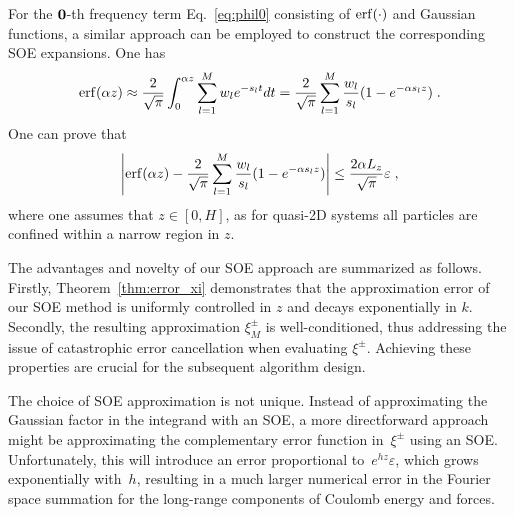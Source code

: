 For the $\boldsymbol{0}$-th frequency term Eq.~\eqref{eq:phil0} consisting of $\operatorname{erf}(\cdot)$ and Gaussian functions, a similar approach can be employed to construct the corresponding SOE expansions. One has
\begin{equation}\label{eq:SOErf}
	\begin{split}
		\operatorname{erf}(\alpha z)\approx \frac{2}{\sqrt{\pi}} \int_0^{\alpha z} \sum_{l = 1}^M w_l e^{-s_l t} dt= \frac{2}{\sqrt{\pi}} \sum_{l = 1}^M \frac{w_l}{s_l} (1 - e^{- \alpha s_l z})\;.
	\end{split}
\end{equation}
One can prove that
\begin{equation}\label{eq::erfSOE}
	\left|\operatorname{erf}(\alpha z)-\frac{2}{\sqrt{\pi}} \sum_{l = 1}^M \frac{w_l}{s_l} (1 - e^{- \alpha s_l z})\right|\leq \frac{2\alpha L_z}{\sqrt{\pi}}\varepsilon\;,
\end{equation}
where one assumes that $z\in[0, H]$, as for quasi-2D systems all particles are confined within a narrow region in $z$. 

The advantages and novelty of our SOE approach are summarized as follows.
Firstly, Theorem~\ref{thm:error_xi} demonstrates that the approximation error of our SOE method is uniformly controlled in $z$ and decays exponentially in $k$. Secondly, the resulting approximation $\xi_{M}^{\pm}$ is well-conditioned, thus addressing the issue of catastrophic error cancellation when evaluating $\xi^{\pm}$. 
Achieving these properties are crucial for the subsequent algorithm design.

\begin{rmk}
	The choice of SOE approximation is not unique. Instead of approximating the Gaussian factor in the integrand with an SOE, a more directforward approach might be approximating the complementary error function in~$\xi^{\pm}$ using an SOE. 
	Unfortunately, this will introduce an error proportional to~$e^{hz} \varepsilon$, which grows exponentially with~$h$, resulting in a much larger numerical error in the Fourier space summation for the long-range components of Coulomb energy and forces.
\end{rmk}	


